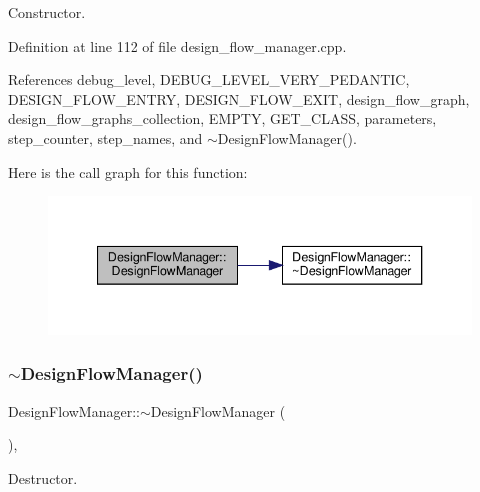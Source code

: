 Constructor. 



Definition at line 112 of file design\+\_\+flow\+\_\+manager.\+cpp.



References debug\+\_\+level, D\+E\+B\+U\+G\+\_\+\+L\+E\+V\+E\+L\+\_\+\+V\+E\+R\+Y\+\_\+\+P\+E\+D\+A\+N\+T\+IC, D\+E\+S\+I\+G\+N\+\_\+\+F\+L\+O\+W\+\_\+\+E\+N\+T\+RY, D\+E\+S\+I\+G\+N\+\_\+\+F\+L\+O\+W\+\_\+\+E\+X\+IT, design\+\_\+flow\+\_\+graph, design\+\_\+flow\+\_\+graphs\+\_\+collection, E\+M\+P\+TY, G\+E\+T\+\_\+\+C\+L\+A\+SS, parameters, step\+\_\+counter, step\+\_\+names, and $\sim$\+Design\+Flow\+Manager().

Here is the call graph for this function\+:
\nopagebreak
\begin{figure}[H]
\begin{center}
\leavevmode
\includegraphics[width=340pt]{de/d63/classDesignFlowManager_a50d4704e76a3132f1cfc24884055faa7_cgraph}
\end{center}
\end{figure}
\mbox{\label{classDesignFlowManager_a8329c2a542d8f94c55fca404c807eded}} 
\subsubsection{\texorpdfstring{$\sim$\+Design\+Flow\+Manager()}{~DesignFlowManager()}}
{\footnotesize\ttfamily Design\+Flow\+Manager\+::$\sim$\+Design\+Flow\+Manager (\begin{DoxyParamCaption}{ }\end{DoxyParamCaption})\hspace{0.3cm}{\ttfamily [virtual]}, {\ttfamily [default]}}



Destructor. 



